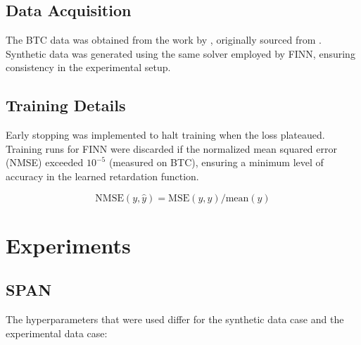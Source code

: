 \documentclass{article}
\begin{document}
\subsection{Data Acquisition}
The BTC data was obtained from the work by \textcite{finn}, originally sourced from \textcite{nowak2016entropy}. Synthetic data was generated using the same solver employed by FINN, ensuring consistency in the experimental setup.

\subsection{Training Details}
Early stopping was implemented to halt training when the loss plateaued. Training runs for FINN were discarded if the normalized mean squared error (NMSE) exceeded $10^{-5}$ (measured on BTC), ensuring a minimum level of accuracy in the learned retardation function.

\begin{equation*}
    \text{NMSE}(y, \hat{y}) = \text{MSE}(y, \hat{y}) / \text{mean}(y)
\end{equation*}




\section{Experiments}

\subsection{SPAN}
The hyperparameters that were used differ for the synthetic data case and the experimental data case:
\end{document}
